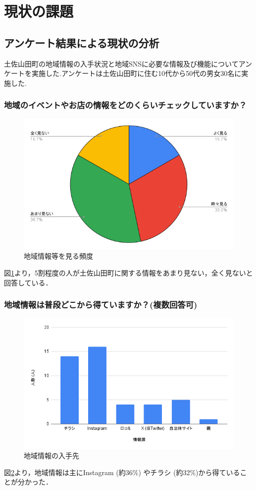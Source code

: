 \section{現状の課題}
\subsection{アンケート結果による現状の分析}
土佐山田町の地域情報の入手状況と地域SNSに必要な情報及び機能についてアンケートを実施した.アンケートは土佐山田町に住む10代から50代の男女30名に実施した.

\subsubsection{地域のイベントやお店の情報をどのくらいチェックしていますか？}
\begin{figure}[H]
    \centering
    \includegraphics[width=0.5\linewidth]{fig125/Q1.png}
    \caption{地域情報等を見る頻度}
    \label{fig:Q1}
\end{figure}
図\ref{fig:Q1}より，5割程度の人が土佐山田町に関する情報をあまり見ない，全く見ないと回答している．

\subsubsection{地域情報は普段どこから得ていますか？(複数回答可)}
\begin{figure}[H]
    \centering
    \includegraphics[width=0.5\linewidth]{fig125/Q3.png}
    \caption{地域情報の入手先}
    \label{fig:Q3}
\end{figure}
図\ref{fig:Q3}より，地域情報は主にInstagram (約36\%) やチラシ (約32\%)から得ていることが分かった．

